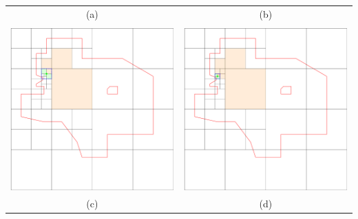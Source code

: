\documentclass[border=2]{standalone}
\begin{document}
\begin{tabular}{cc}
        \LARGE (a) & \LARGE (b) \\
        & \\
        \includegraphics[scale=0.4]{example2} & \includegraphics[scale=0.4]{example3} \\
        \LARGE (c) & \LARGE (d) \\
    \end{tabular}
\end{document}
